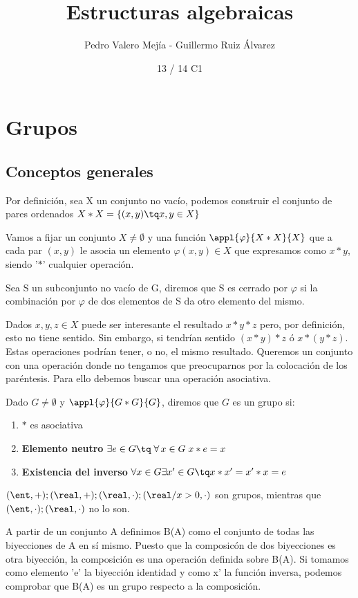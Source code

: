 \documentclass[nochap]{apuntes}
\title{Estructuras algebraicas}
\author{Pedro Valero Mejía - Guillermo Ruiz Álvarez}
\date{13 / 14 C1}
\begin{document}
\pagestyle{plain}
\maketitle
\tableofcontents
\newpage

\section{Grupos}
 
 \subsection{Conceptos generales}
 Por definición, sea X un conjunto no vacío, podemos construir el conjunto de pares ordenados $X\ast X=\{(x,y)\tq x,y\in X\}$
 
 Vamos a fijar un conjunto $X\neq \emptyset$  y una función $\appl{\varphi}{X\ast X}{X}$ que a cada par $(x,y)$ le 
 asocia un elemento $\varphi(x,y) \in X$ que expresamos como $x\ast y$, siendo '$\ast$' cualquier operación.
 
 \begin{defn}
  Sea S un subconjunto no vacío de G, diremos que S es cerrado por $\varphi$  si la combinación por $\varphi$  de dos elementos de
  S da otro elemento del mismo.
 \end{defn}
 
 Dados $x,y,z \in X$ puede ser interesante el resultado $x\ast y\ast z$ pero, por definición, esto no tiene sentido. Sin embargo, si tendrían 
 sentido $(x\ast y)\ast z$ ó $x\ast (y\ast z)$. Estas operaciones podrían tener, o no, el mismo resultado. Queremos un conjunto con una operación 
 donde no tengamos que preocuparnos por la colocación de los paréntesis. Para ello debemos buscar una operación asociativa.
 
 \begin{defn}[Grupo]
 Dado $G\neq \emptyset$  y $\appl{\varphi}{G\ast G}{G}$, diremos que $G$ es un grupo si:
 \begin{enumerate}
  \item $\ast$ es asociativa
  \item \textbf{Elemento neutro} $\exists  e \in G \tq \; \forall\, x\in G\; x\ast e=x$
  \item \textbf{Existencia del inverso} $\forall x \in G \exists x' \in G \tq x\ast x'=x'\ast x=e$
 \end{enumerate}
\end{defn}

 \begin{example}
   $ (\ent, +); (\real, +); (\real, \cdot); (\real/x>0, \cdot)$ son grupos, mientras que 
   $(\ent, \cdot); (\real, \cdot)$ no lo son.
   
   A partir de un conjunto A definimos B(A) como el conjunto de todas las biyecciones de A en sí mismo. Puesto que la composicón 
   de dos biyecciones es otra biyección, la composición es una operación definida sobre B(A). Si tomamos como elemento 'e' la biyección 
   identidad y como x' la función inversa, podemos comprobar que B(A) es un grupo respecto a la composición.
 \end{example}
  
\end{document}
